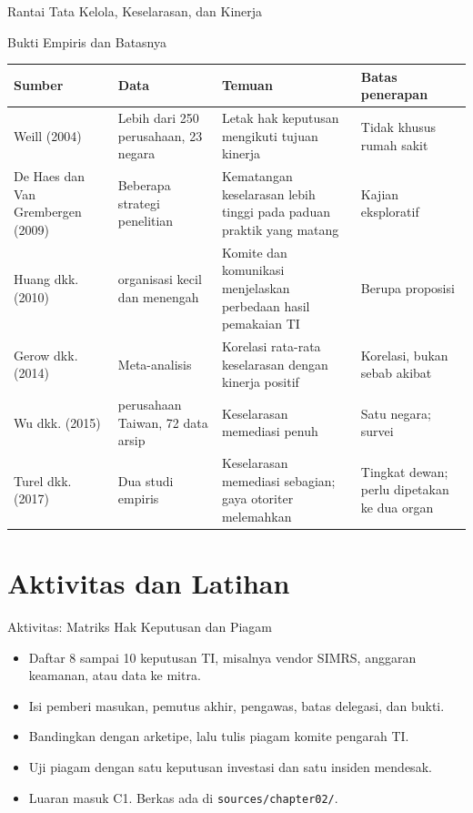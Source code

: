 \documentclass[aspectratio=169, table, 12pt]{beamer}
\begin{document}
\begin{frame}{{\Large Rantai Tata Kelola, Keselarasan, dan Kinerja}}
  \centering
  \resizebox{!}{0.74\textheight}{}
\end{frame}

\begin{frame}{{\Large Bukti Empiris dan Batasnya}}
  \vspace{2pt}
  \scriptsize
  \begin{tabularx}{\textwidth}{|>{\raggedright\arraybackslash}p{}|>{\raggedright\arraybackslash}p{}|>{\raggedright\arraybackslash}X|>{\raggedright\arraybackslash}p{}|}
    \hline
    \textbf{Sumber} & \textbf{Data} & \textbf{Temuan} & \textbf{Batas penerapan} \\ \hline
    Weill (2004) & Lebih dari 250 perusahaan, 23 negara & Letak hak keputusan mengikuti tujuan kinerja &
    Tidak khusus rumah sakit \\ \hline
    De Haes dan Van Grembergen (2009) & Beberapa strategi penelitian & Kematangan keselarasan lebih tinggi
    pada paduan praktik yang matang & Kajian eksploratif \\ \hline
    Huang dkk. (2010) & 3 organisasi kecil dan menengah & Komite dan komunikasi menjelaskan perbedaan hasil
    pemakaian TI & Berupa proposisi \\ \hline
    Gerow dkk. (2014) & Meta-analisis & Korelasi rata-rata keselarasan dengan kinerja positif & Korelasi,
    bukan sebab akibat \\ \hline
    Wu dkk. (2015) & 131 perusahaan Taiwan, 72 data arsip & Keselarasan memediasi penuh & Satu negara; survei
    \\ \hline
    Turel dkk. (2017) & Dua studi empiris & Keselarasan memediasi sebagian; gaya otoriter melemahkan & Tingkat
    dewan; perlu dipetakan ke dua organ \\ \hline
  \end{tabularx}
\end{frame}

\section{Aktivitas dan Latihan}

\begin{frame}{{\Large Aktivitas: Matriks Hak Keputusan dan Piagam}}
  \vspace{2pt}
  \small
  \begin{itemize}
    \item Daftar 8 sampai 10 keputusan TI, misalnya vendor SIMRS, anggaran keamanan, atau data ke mitra.
    \item Isi pemberi masukan, pemutus akhir, pengawas, batas delegasi, dan bukti.
    \item Bandingkan dengan arketipe, lalu tulis piagam komite pengarah TI.
    \item Uji piagam dengan satu keputusan investasi dan satu insiden mendesak.
    \item Luaran masuk C1. Berkas ada di \texttt{sources/chapter02/}.
  \end{itemize}
\end{frame}
\end{document}
